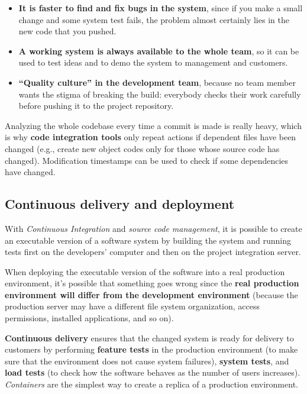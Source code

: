 \begin{itemize}
    \item \textbf{It is faster to find and fix bugs in the system}, since if you make a small change and some system test fails, the problem almost certainly lies in the new code that you pushed.
    \item \textbf{A working system is always available to the whole team}, so it can be used to test ideas and to demo the system to management and customers.
    \item \textbf{“Quality culture” in the development team}, because no team member wants the stigma of breaking the build: everybody checks their work carefully before pushing it to the project repository.
\end{itemize}

Analyzing the whole codebase every time a commit is made is really heavy, which is why \textbf{code integration tools} only repeat actions if dependent files have been changed (e.g., create new object codes only for those whose source code has changed). Modification timestamps can be used to check if some dependencies have changed.

\subsection{Continuous delivery and deployment}

With \textit{Continuous Integration} and \textit{source code management}, it is possible to create an executable version of a software system by building the system and running tests first on the developers' computer and then on the project integration server.

When deploying the executable version of the software into a real production environment, it's possible that something goes wrong since the \textbf{real production environment will differ from the development environment} (because the production server may have a different file system organization, access permissions, installed applications, and so on).

\textbf{Continuous delivery} ensures that the changed system is ready for delivery to customers by performing \textbf{feature tests} in the production environment (to make sure that the environment does not cause system failures), \textbf{system tests}, and \textbf{load tests} (to check how the software behaves as the number of users increases). \textit{Containers} are the simplest way to create a replica of a production environment.

